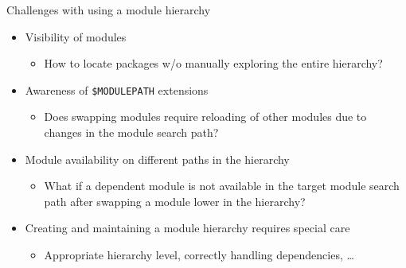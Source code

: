 \documentclass[10pt,xcolor={usenames,dvipsnames}]{beamer}
\begin{document}
\begin{frame}{Challenges with using a module hierarchy}
\begin{itemize}
    \item
        Visibility of modules
        \begin{itemize}
            \item
                How to locate packages w/o manually exploring the entire
                hierarchy?
        \end{itemize}
    \smallskip
    \item
        Awareness of \texttt{\$MODULEPATH} extensions
        \begin{itemize}
            \item
                Does swapping modules require reloading of other modules due
                to changes in the module search path?
        \end{itemize}
    \smallskip
    \item
        Module availability on different paths in the hierarchy
        \begin{itemize}
            \item
                What if a dependent module is not available in the target
                module search path after swapping a module lower in the
                hierarchy?
        \end{itemize}
    \smallskip
    \item
        Creating and maintaining a module hierarchy requires special care
        \begin{itemize}
            \item
                Appropriate hierarchy level, correctly handling dependencies, \ldots
        \end{itemize}
\end{itemize}
\end{frame}

\end{document}

